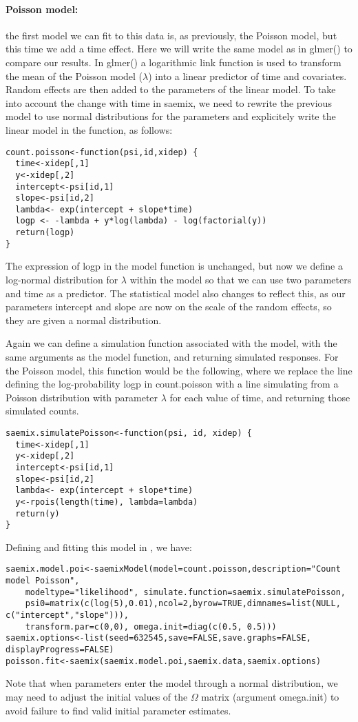 \paragraph{Poisson model:} the first model we can fit to this data is, as previously, the Poisson model, but this time we add a time effect. Here we will write the same model as in {\sf glmer()} to compare our results. In {\sf glmer()} a logarithmic link function is used to transform the mean of the Poisson model ($\lambda$) into a linear predictor of time and covariates. Random effects are then added to the parameters of the linear model. To take into account the change with time in {\sf saemix}, we need to rewrite the previous model to use normal distributions for the parameters and explicitely write the linear model in the function, as follows:
\begin{verbatim}
count.poisson<-function(psi,id,xidep) { 
  time<-xidep[,1]
  y<-xidep[,2]
  intercept<-psi[id,1]
  slope<-psi[id,2]
  lambda<- exp(intercept + slope*time)
  logp <- -lambda + y*log(lambda) - log(factorial(y))
  return(logp)
}
\end{verbatim}
The expression of logp in the model function is unchanged, but now we define a log-normal distribution for $\lambda$ within the model so that we can use two parameters and time as a predictor. The statistical model also changes to reflect this, as our parameters intercept and slope are now on the scale of the random effects, so they are given a normal distribution. 

Again we can define a simulation function associated with the model, with the same arguments as the model function, and returning simulated responses. For the Poisson model, this function would be the following, where we replace the line defining the log-probability {\sf logp} in {\sf count.poisson} with a line simulating from a Poisson distribution with parameter $\lambda$ for each value of time, and returning those simulated counts.
\begin{verbatim}
saemix.simulatePoisson<-function(psi, id, xidep) {
  time<-xidep[,1]
  y<-xidep[,2]
  intercept<-psi[id,1]
  slope<-psi[id,2]
  lambda<- exp(intercept + slope*time)
  y<-rpois(length(time), lambda=lambda)
  return(y)
}
\end{verbatim}

Defining and fitting this model in \monolix, we have:
\begin{verbatim}
saemix.model.poi<-saemixModel(model=count.poisson,description="Count model Poisson",
    modeltype="likelihood", simulate.function=saemix.simulatePoisson,
    psi0=matrix(c(log(5),0.01),ncol=2,byrow=TRUE,dimnames=list(NULL, c("intercept","slope"))), 
    transform.par=c(0,0), omega.init=diag(c(0.5, 0.5)))
saemix.options<-list(seed=632545,save=FALSE,save.graphs=FALSE, displayProgress=FALSE)
poisson.fit<-saemix(saemix.model.poi,saemix.data,saemix.options)
\end{verbatim}
Note that when parameters enter the model through a normal distribution, we may need to adjust the initial values of the $\Omega$ matrix (argument {\sf omega.init}) to avoid failure to find valid initial parameter estimates.

